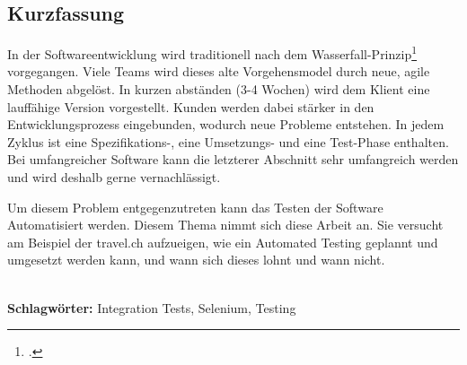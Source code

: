 
\subsection*{Kurzfassung}
In der Softwareentwicklung wird traditionell nach dem Wasserfall-Prinzip\footcite{Wasserfallmodell} vorgegangen. Viele Teams wird dieses alte Vorgehensmodel durch neue, agile Methoden abgelöst. In kurzen abständen (3-4 Wochen) wird dem Klient eine lauffähige Version vorgestellt. Kunden werden dabei stärker in den Entwicklungsprozess eingebunden, wodurch neue Probleme entstehen. In jedem Zyklus ist eine Spezifikations-, eine Umsetzungs- und eine Test-Phase enthalten. Bei umfangreicher Software kann die letzterer Abschnitt sehr umfangreich werden und wird deshalb gerne vernachlässigt.

Um diesem Problem entgegenzutreten kann das Testen der Software Automatisiert werden. Diesem Thema nimmt sich diese Arbeit an. Sie versucht am Beispiel der travel.ch aufzueigen, wie ein Automated Testing geplannt und umgesetzt werden kann, und wann sich dieses lohnt und wann nicht.

%
\mbox{}\\[0.5\baselineskip]\noindent
\textbf{Schlagwörter:} 
Integration Tests, Selenium, Testing
